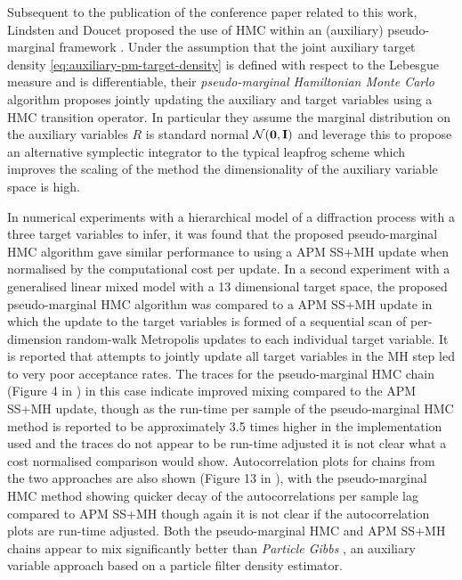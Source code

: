 Subsequent to the publication of the conference paper related to this work, Lindsten and Doucet proposed the use of \ac{HMC} within an (auxiliary) pseudo-marginal framework \citep{lindsten2016pseudo}. Under the assumption that the joint auxiliary target density \eqref{eq:auxiliary-pm-target-density} is defined with respect to the Lebesgue measure and is differentiable, their \emph{pseudo-marginal Hamiltonian Monte Carlo} algorithm proposes jointly updating the auxiliary and target variables using a \ac{HMC} transition operator. In particular they assume the marginal distribution on the auxiliary variables $R$ is standard normal $\nrm{\vct{0},\idmtx}$ and leverage this to propose an alternative symplectic integrator to the typical leapfrog scheme which improves the scaling of the method the dimensionality of the auxiliary variable space is high. 

In numerical experiments with a hierarchical model of a diffraction process with a three target variables to infer, it was found that the proposed pseudo-marginal \ac{HMC} algorithm gave similar performance to using a \ac{APM} \ac{SS}+\ac{MH} update when normalised by the computational cost per update. In a second experiment with a generalised linear mixed model with a 13 dimensional target space, the proposed pseudo-marginal \ac{HMC} algorithm was compared to a \ac{APM} \ac{SS}+\ac{MH} update in which the update to the target variables is formed of a sequential scan of per-dimension random-walk Metropolis updates to each individual target variable. It is reported that attempts to jointly update all target variables in the \ac{MH} step led to very poor acceptance rates. The traces for the pseudo-marginal \ac{HMC} chain (Figure 4 in \citep{lindsten2016pseudo}) in this case indicate improved mixing compared to the \ac{APM} \ac{SS}+\ac{MH} update, though as the run-time per sample of the pseudo-marginal \ac{HMC} method is reported to be approximately 3.5 times higher in the implementation used and the traces do not appear to be run-time adjusted it is not clear what a cost normalised comparison would show. Autocorrelation plots for chains from the two approaches are also shown (Figure 13 in \citep{lindsten2016pseudo}), with the pseudo-marginal \ac{HMC} method showing quicker decay of the autocorrelations per sample lag compared to \ac{APM} \ac{SS}+\ac{MH} though again it is not clear if the autocorrelation plots are run-time adjusted. Both the pseudo-marginal \ac{HMC} and \ac{APM} \ac{SS}+\ac{MH} chains appear to mix significantly better than \emph{Particle Gibbs} \citep{andrieu2009pseudo}, an auxiliary variable approach based on a particle filter density estimator. %

